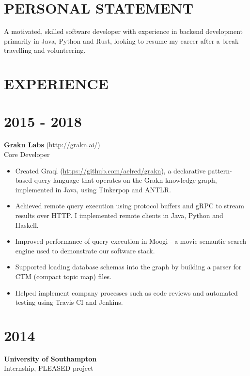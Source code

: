 \documentclass[margin]{res}
\begin{document}
\begin{resume}

\section{PERSONAL STATEMENT}

A motivated, skilled software developer with experience in backend development primarily in Java, Python and Rust, looking to resume my career after a break travelling and volunteering.

\section{EXPERIENCE}

\normalsize{\section{2015 - 2018}}
{\bf Grakn Labs} (\href{http://grakn.ai/}{http://grakn.ai/}) \\
Core Developer
\begin{itemize}

\item
Created Graql (\href{https://github.com/aelred/grakn}{https://github.com/aelred/grakn}), a declarative pattern-based query language that operates on the Grakn knowledge graph, implemented in Java, using Tinkerpop and ANTLR.

\item
Achieved remote query execution using protocol buffers and gRPC to stream results over HTTP. I implemented remote clients in Java, Python and Haskell.

\item
Improved performance of query execution in Moogi - a movie semantic search engine used to demonstrate our software stack.

\item
Supported loading database schemas into the graph by building a parser for CTM (compact topic map) files.

\item
Helped implement company processes such as code reviews and automated testing using Travis CI and Jenkins.

\end{itemize}

\normalsize{\section{2014}}
{\bf University of Southampton} \\
Internship, PLEASED project


\end{resume}
\end{document}
